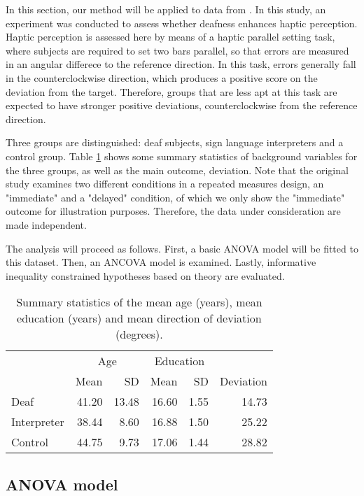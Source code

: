 \label{example}

In this section, our method will be applied to data from \citet{van2013superior}. In this study, an experiment was conducted to assess whether deafness enhances haptic perception. Haptic perception is assessed here by means of a haptic parallel setting task, where subjects are required to set two bars parallel, so that errors are measured in an angular differece to the reference direction. In this task, errors generally fall in the counterclockwise direction, which produces a positive score on the deviation from the target. Therefore, groups that are less apt at this task are expected to have stronger positive deviations, counterclockwise from the reference direction.

Three groups are distinguished: deaf subjects, sign language interpreters and a control group. Table \ref{ExampleDescrTable} shows some summary statistics of background variables for the three groups, as well as the main outcome, deviation. Note that the original study examines two different conditions in a repeated measures design, an "immediate" and a "delayed" condition, of which we only show the "immediate" outcome for illustration purposes. Therefore, the data under consideration are made independent.

The analysis will proceed as follows. First, a basic ANOVA model will be fitted to this dataset. Then, an ANCOVA model is examined. Lastly, informative inequality constrained hypotheses based on theory are evaluated.

\begin{table}[btp]
\centering
\caption{Summary statistics of the mean age (years), mean education (years) and mean direction of deviation (degrees).} 
\label{ExampleDescrTable}
\begin{tabular}{lrrrrr}
  \toprule & \multicolumn{2}{c}{Age} & \multicolumn{2}{c}{Education} &  \\  \cmidrule(lr){2-3} \cmidrule(lr){4-5}  & Mean & SD & Mean & SD & Deviation \\ 
  \midrule
Deaf & 41.20 & 13.48 & 16.60 & 1.55 & 14.73 \\ 
  Interpreter & 38.44 & 8.60 & 16.88 & 1.50 & 25.22 \\ 
  Control & 44.75 & 9.73 & 17.06 & 1.44 & 28.82 \\ 
   \bottomrule
\end{tabular}
\end{table}



\subsection{ANOVA model}



